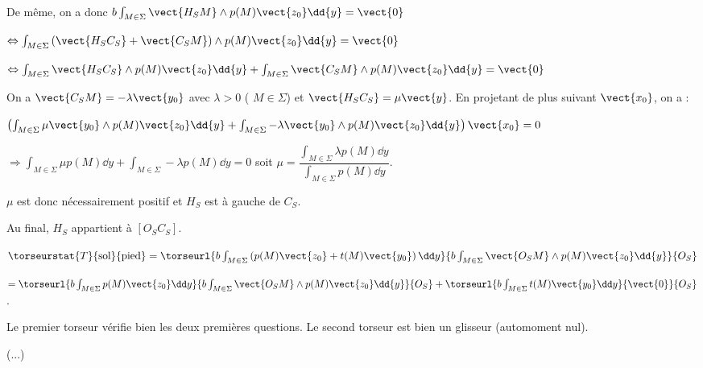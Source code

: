 \begin{multicols}{2}
\begin{corrige}
De même, on a donc $ b \int_{M\in\Sigma} \vect{H_S M} \wedge p(M)\vect{z_0} \dd {y}= \vect{0}$

$ \Leftrightarrow \int_{M\in\Sigma}\left( \vect{H_S C_S}+\vect{C_S M} \right)\wedge p(M)\vect{z_0} \dd {y}= \vect{0}$


$ \Leftrightarrow \int_{M\in\Sigma} \vect{H_S C_S}\wedge p(M)\vect{z_0} \dd {y} +\int_{M\in\Sigma}\vect{C_S M}\wedge p(M)\vect{z_0} \dd {y}  = \vect{0}$

On a $\vect{C_SM}= - \lambda \vect{y_0}$ avec $\lambda>0$ ( $M\in \Sigma$) et $\vect{H_S C_S} = \mu \vect{y}$. En projetant de plus suivant $\vect{x_0}$, on a : 

$ \left(\int_{M\in\Sigma}\mu \vect{y_0} \wedge p(M)\vect{z_0} \dd {y} +\int_{M\in\Sigma}- \lambda \vect{y_0} \wedge p(M)\vect{z_0} \dd {y}\right)\vect{x_0}  = {0}$

$ \Rightarrow \int_{M\in\Sigma}\mu p(M) \dd {y} +\int_{M\in\Sigma}- \lambda  p(M)\dd {y}  = {0}$
soit $  \mu  =\dfrac{ \int_{M\in\Sigma} \lambda  p(M)\dd {y}}{\int_{M\in\Sigma} p(M) \dd {y}} $.

$\mu$ est donc nécessairement positif et $H_S$ est à gauche de $C_S$. 

Au final, $H_S$ appartient à $\left[O_S C_S \right]$.




\end{corrige}
\else
\fi



\ifprof
\begin{corrige}
$
\torseurstat{T}{\text{sol}}{\text{pied}}=\torseurl{b\int_{M\in\Sigma}\left(p(M)\vect{z_0}+t(M)\vect{y_0}\right) \dd y }{b\int_{M\in\Sigma} \vect{O_S M} \wedge p(M)\vect{z_0} \dd {y}}{O_S}$

$=\torseurl{b\int_{M\in\Sigma}p(M)\vect{z_0}\dd y }{b\int_{M\in\Sigma} \vect{O_S M} \wedge p(M)\vect{z_0} \dd {y}}{O_S}+\torseurl{b\int_{M\in\Sigma}t(M)\vect{y_0}\dd y }{\vect{0}}{O_S}$.

Le premier torseur vérifie bien les deux premières questions. Le second torseur est bien un glisseur (automoment nul). 

(...)


\end{corrige}
\else
\fi


\end{multicols}
